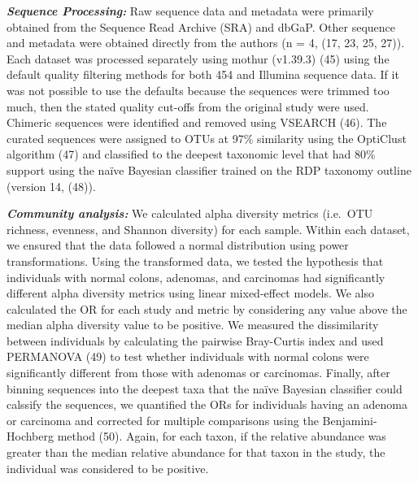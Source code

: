 \documentclass[12pt,]{article}
\begin{document}
\textbf{\emph{Sequence Processing:}} Raw sequence data and metadata were
primarily obtained from the Sequence Read Archive (SRA) and dbGaP. Other
sequence and metadata were obtained directly from the authors (n = 4,
(17, 23, 25, 27)). Each dataset was processed separately using mothur
(v1.39.3) (45) using the default quality filtering methods for both 454
and Illumina sequence data. If it was not possible to use the defaults
because the sequences were trimmed too much, then the stated quality
cut-offs from the original study were used. Chimeric sequences were
identified and removed using VSEARCH (46). The curated sequences were
assigned to OTUs at 97\% similarity using the OptiClust algorithm (47)
and classified to the deepest taxonomic level that had 80\% support
using the naïve Bayesian classifier trained on the RDP taxonomy outline
(version 14, (48)).

\textbf{\emph{Community analysis:}} We calculated alpha diversity
metrics (i.e.~OTU richness, evenness, and Shannon diversity) for each
sample. Within each dataset, we ensured that the data followed a normal
distribution using power transformations. Using the transformed data, we
tested the hypothesis that individuals with normal colons, adenomas, and
carcinomas had significantly different alpha diversity metrics using
linear mixed-effect models. We also calculated the OR for each study and
metric by considering any value above the median alpha diversity value
to be positive. We measured the dissimilarity between individuals by
calculating the pairwise Bray-Curtis index and used PERMANOVA (49) to
test whether individuals with normal colons were significantly different
from those with adenomas or carcinomas. Finally, after binning sequences
into the deepest taxa that the naïve Bayesian classifier could calssify
the sequences, we quantified the ORs for individuals having an adenoma
or carcinoma and corrected for multiple comparisons using the
Benjamini-Hochberg method (50). Again, for each taxon, if the relative
abundance was greater than the median relative abundance for that taxon
in the study, the individual was considered to be positive.
\end{document}
